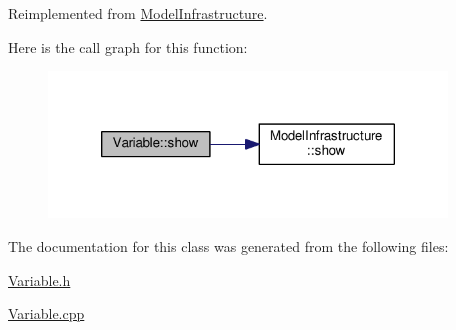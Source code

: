 Reimplemented from \hyperlink{class_model_infrastructure_a649a5a89a0c9931783d3c51de2acf266}{Model\-Infrastructure}.



Here is the call graph for this function\-:
\nopagebreak
\begin{figure}[H]
\begin{center}
\leavevmode
\includegraphics[width=300pt]{class_variable_a8bd0a772bb32fd630e252306306cd154_cgraph}
\end{center}
\end{figure}




The documentation for this class was generated from the following files\-:\begin{DoxyCompactItemize}
\item 
\hyperlink{_variable_8h}{Variable.\-h}\item 
\hyperlink{_variable_8cpp}{Variable.\-cpp}\end{DoxyCompactItemize}
